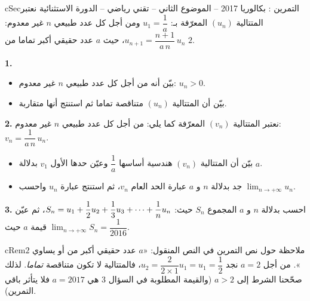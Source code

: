 \documentclass[12pt,a4paper]{article}
\newenvironment{BOX}[2]{\begin{otherlanguage}{english}\begin{arbox}{#1}{#2}}{\end{arbox}\end{otherlanguage}}
\newenvironment{molahada}[1][ملاحظة]{\begin{BOX}{cRem}{#1}}{\end{BOX}}
\newcounter{exo}
\newenvironment{tamrin}[1]{\stepcounter{exo}\begin{BOX}{cSec}{التمرين \theexo: #1}}{\end{BOX}}
\renewcommand{\cdots}{\mathinner{\cdotp\cdotp\cdotp}}
\newcommand{\limn}{\displaystyle\lim_{n\to+\infty}}
\newenvironment{sq}{\begin{itemize}[leftmargin=2.4em,itemsep=3pt]}{\end{itemize}}
\newcommand{\qa}{\item[(أ)]}\newcommand{\qb}{\item[(ب)]}\newcommand{\qc}{\item[(جـ)]}\newcommand{\qd}{\item[(د)]}\newcommand{\qe}{\item[(هـ)]}
\newcommand{\QQ}[1]{\par\smallskip\textbf{#1.} }
\begin{document}
\begin{tamrin}{بكالوريا 2017 -- الموضوع الثاني -- تقني رياضي -- الدورة الاستثنائية}
نعتبر المتتالية $(u_n)$ المعرّفة بـ: $u_1=\dfrac1a$ ومن أجل كل عدد طبيعي $n$ غير معدوم: $u_{n+1}=\dfrac{n+1}{a\,n}\,u_n$، حيث $a$ عدد حقيقي أكبر تماما من $2$.

\QQ{1}
\begin{sq}
\qa بيّن أنه من أجل كل عدد طبيعي $n$ غير معدوم: $u_n>0$.
\qb بيّن أن المتتالية $(u_n)$ متناقصة تماما ثم استنتج أنها متقاربة.
\end{sq}

\QQ{2} نعتبر المتتالية $(v_n)$ المعرّفة كما يلي: من أجل كل عدد طبيعي $n$ غير معدوم: $v_n=\dfrac{1}{a\,n}\,u_n$.
\begin{sq}
\qa بيّن أن المتتالية $(v_n)$ هندسية أساسها $\dfrac1a$ وعيّن حدها الأول $v_1$ بدلالة $a$.
\qb جد بدلالة $n$ و $a$ عبارة الحد العام $v_n$، ثم استنتج عبارة $u_n$ واحسب $\limn u_n$.
\end{sq}

\QQ{3} احسب بدلالة $n$ و $a$ المجموع $S_n$ حيث: $S_n=u_1+\dfrac12u_2+\dfrac13u_3+\cdots+\dfrac1n u_n$، ثم عيّن قيمة $a$ حيث $\limn S_n=\dfrac{1}{2016}$.
\end{tamrin}

\begin{molahada}[ملاحظة حول نص التمرين]
في النص المنقول: «$a$ عدد حقيقي أكبر من أو يساوي $2$». من أجل $a=2$ نجد $u_2=\dfrac{2}{2\times1}u_1=u_1=\dfrac12$، فالمتتالية لا تكون متناقصة \emph{تماما}. لذلك صحّحنا الشرط إلى $a>2$ (والقيمة المطلوبة في السؤال 3 هي $a=2017$ فلا يتأثر باقي التمرين).
\end{molahada}
\end{document}
